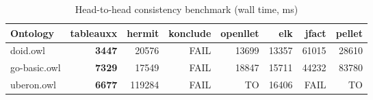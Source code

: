 \begin{table}[t]
\centering
\caption{Head-to-head consistency benchmark (wall time, ms)}
\label{tab:head_to_head_wall_ms}
\begin{tabular}{lrrrrrrr}
\toprule
Ontology & tableauxx & hermit & konclude & openllet & elk & jfact & pellet \\
\midrule
doid.owl & \textbf{3447} & 20576 & FAIL & 13699 & 13357 & 61015 & 28610 \\
go-basic.owl & \textbf{7329} & 17549 & FAIL & 18847 & 15711 & 44232 & 83780 \\
uberon.owl & \textbf{6677} & 119284 & FAIL & TO & 16406 & FAIL & TO \\
\bottomrule
\end{tabular}
\end{table}
